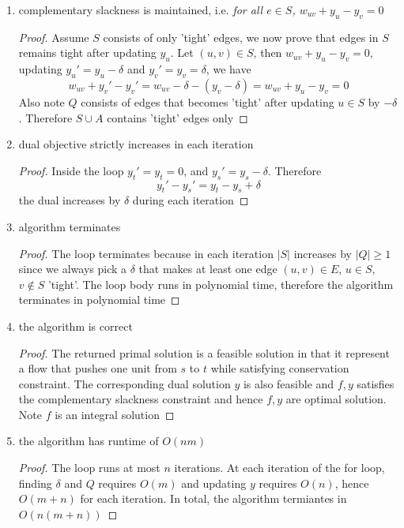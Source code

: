 \documentclass[11pt]{article}
\begin{document}
\begin{enumerate}
\begin{enumerate}
\item complementary slackness is maintained, i.e. \textit{for all $e\in S$, $w_{uv} + y_u - y_v = 0$}
\begin{proof}
    Assume $S$ consists of only 'tight' edges, we now prove that edges in $S$ remains tight after updating $y_u$. Let $(u,v)\in S$, then $w_{uv} + y_u - y_v = 0$, updating $y_u' = y_u - \delta$ and $y_v' = y_v = \delta$, we have 
    \[
        w_{uv} + y_v' - y_v' = w_{uv} - \delta - (y_v - \delta) = w_{uv} + y_u - y_v = 0
    \]
    Also note $Q$ consists of edges that becomes 'tight' after updating $u\in S$ by $-\delta$. Therefore $S \cup A$ contains 'tight' edges only
\end{proof}
\item dual objective strictly increases in each iteration 
\begin{proof}
    Inside the loop $y_t' = y_t = 0$, and $y_s' = y_s - \delta$. Therefore 
    \[
        y_t' - y_s' = y_t - y_s + \delta
    \]
    the dual increases by $\delta$ during each iteration
\end{proof}
\item algorithm terminates
\begin{proof}
    The loop terminates because in each iteration $|S|$ increases by $|Q| \geq 1$ since we always pick a $\delta$ that makes at least one edge $(u,v)\in E$, $u\in S$, $v\not\in S$ 'tight'. The loop body runs in polynomial time, therefore the algorithm terminates in polynomial time 
\end{proof}
\item the algorithm is correct 
\begin{proof}
    The returned primal solution is a feasible solution in that it represent a flow that pushes one unit from $s$ to $t$ while satisfying conservation constraint. The corresponding dual solution $y$ is also feasible and $f,y$ satisfies the complementary slackness constraint and hence $f,y$ are optimal solution. Note $f$ is an integral solution 
\end{proof}
\item the algorithm has runtime of $O(nm)$
\begin{proof}
    The loop runs at most $n$ iterations. At each iteration of the for loop, finding $\delta$ and $Q$ requires $O(m)$ and updating $y$ requires $O(n)$, hence $O(m+n)$ for each iteration. In total, the algorithm termiantes in $O(n(m+n))$ 
\end{proof}


\end{enumerate}
\end{enumerate}
\end{document}
